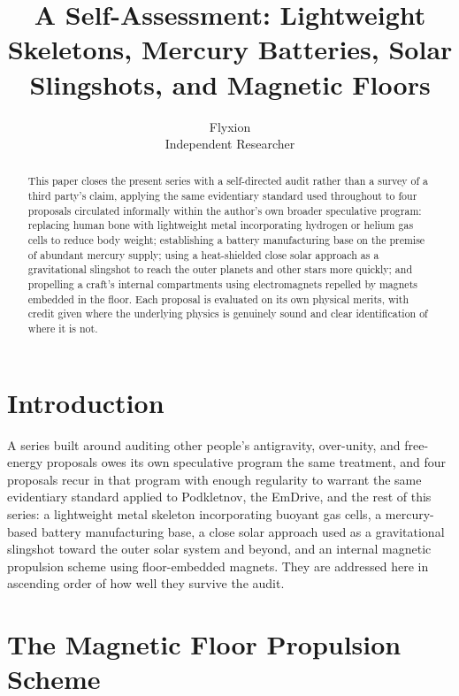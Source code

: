 \documentclass[11pt]{article}
\title{A Self-Assessment: Lightweight Skeletons, Mercury Batteries, Solar Slingshots, and Magnetic Floors}
\author{Flyxion \\ \small Independent Researcher}
\date{}
\begin{document}
\maketitle

\begin{abstract}
This paper closes the present series with a self-directed audit rather than a survey of a third party's claim, applying the same evidentiary standard used throughout to four proposals circulated informally within the author's own broader speculative program: replacing human bone with lightweight metal incorporating hydrogen or helium gas cells to reduce body weight; establishing a battery manufacturing base on the premise of abundant mercury supply; using a heat-shielded close solar approach as a gravitational slingshot to reach the outer planets and other stars more quickly; and propelling a craft's internal compartments using electromagnets repelled by magnets embedded in the floor. Each proposal is evaluated on its own physical merits, with credit given where the underlying physics is genuinely sound and clear identification of where it is not.
\end{abstract}

\section{Introduction}

A series built around auditing other people's antigravity, over-unity, and free-energy proposals owes its own speculative program the same treatment, and four proposals recur in that program with enough regularity to warrant the same evidentiary standard applied to Podkletnov, the EmDrive, and the rest of this series: a lightweight metal skeleton incorporating buoyant gas cells, a mercury-based battery manufacturing base, a close solar approach used as a gravitational slingshot toward the outer solar system and beyond, and an internal magnetic propulsion scheme using floor-embedded magnets. They are addressed here in ascending order of how well they survive the audit.

\section{The Magnetic Floor Propulsion Scheme}
\end{document}
